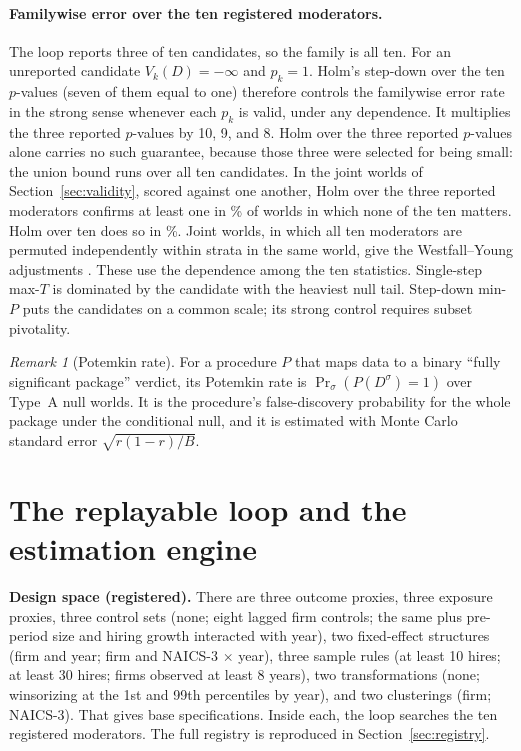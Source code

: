 \documentclass[11pt]{article}
\theoremstyle{remark}\newtheorem{remark}{Remark}
\begin{document}
\paragraph{Familywise error over the ten registered moderators.} The loop reports three of ten candidates, so the family is
all ten. For an unreported candidate $V_k(D)=-\infty$ and $p_k=1$. Holm's step-down over the ten $p$-values (seven of them
equal to one) therefore controls the familywise error rate in the strong sense whenever each $p_k$ is valid, under any
dependence. It multiplies the three reported $p$-values by 10, 9, and 8. Holm over the three reported $p$-values alone carries
no such guarantee, because those three were selected for being small: the union bound runs over all ten candidates. In the
joint worlds of Section~\ref{sec:validity}, scored against one another, Holm over the three reported moderators confirms at
least one in \VFwerHolmThree\% of worlds in which none of the ten matters. Holm over ten does so in \VFwerHolmTen\%. Joint
worlds, in which all ten moderators are permuted independently within strata in the same world, give the Westfall--Young
adjustments \citep{westfall1993resampling}. These use the dependence among the ten statistics. Single-step max-$T$ is
dominated by the candidate with the heaviest null tail. Step-down min-$P$ puts the candidates on a common scale; its strong
control requires subset pivotality.

\begin{remark}[Potemkin rate]
For a procedure $P$ that maps data to a binary ``fully significant package'' verdict, its Potemkin rate is
$\Pr_{\sigma}(P(D^{\sigma})=1)$ over Type~A null worlds. It is the procedure's false-discovery probability for the whole
package under the conditional null, and it is estimated with Monte Carlo standard error $\sqrt{r(1-r)/B}$.
\end{remark}

\section{The replayable loop and the estimation engine}\label{sec:loop}

\textbf{Design space (registered).} There are three outcome proxies, three exposure proxies, three control sets (none;
eight lagged firm controls; the same plus pre-period size and hiring growth interacted with year), two fixed-effect
structures (firm and year; firm and NAICS-3 $\times$ year), three sample rules (at least 10 hires; at least 30 hires; firms
observed at least 8 years), two transformations (none; winsorizing at the 1st and 99th percentiles by year), and two
clusterings (firm; NAICS-3). That gives \NbaseSpecs base specifications. Inside each, the loop searches the ten registered
moderators. The full registry is reproduced in Section~\ref{sec:registry}.
\end{document}
